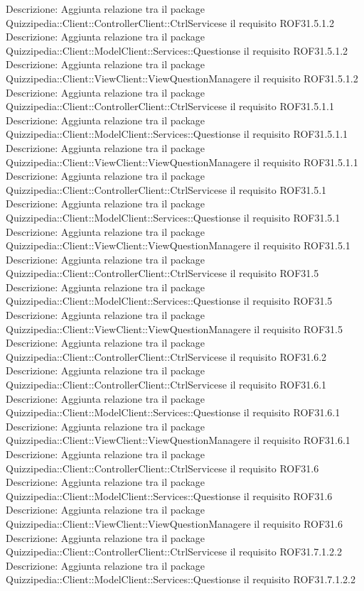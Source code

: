 Descrizione: Aggiunta relazione tra il package Quizzipedia::Client::ControllerClient::CtrlServicese il requisito ROF31.5.1.2 
Descrizione: Aggiunta relazione tra il package Quizzipedia::Client::ModelClient::Services::Questionse il requisito ROF31.5.1.2 
Descrizione: Aggiunta relazione tra il package Quizzipedia::Client::ViewClient::ViewQuestionManagere il requisito ROF31.5.1.2 
Descrizione: Aggiunta relazione tra il package Quizzipedia::Client::ControllerClient::CtrlServicese il requisito ROF31.5.1.1 
Descrizione: Aggiunta relazione tra il package Quizzipedia::Client::ModelClient::Services::Questionse il requisito ROF31.5.1.1 
Descrizione: Aggiunta relazione tra il package Quizzipedia::Client::ViewClient::ViewQuestionManagere il requisito ROF31.5.1.1 
Descrizione: Aggiunta relazione tra il package Quizzipedia::Client::ControllerClient::CtrlServicese il requisito ROF31.5.1 
Descrizione: Aggiunta relazione tra il package Quizzipedia::Client::ModelClient::Services::Questionse il requisito ROF31.5.1 
Descrizione: Aggiunta relazione tra il package Quizzipedia::Client::ViewClient::ViewQuestionManagere il requisito ROF31.5.1 
Descrizione: Aggiunta relazione tra il package Quizzipedia::Client::ControllerClient::CtrlServicese il requisito ROF31.5 
Descrizione: Aggiunta relazione tra il package Quizzipedia::Client::ModelClient::Services::Questionse il requisito ROF31.5 
Descrizione: Aggiunta relazione tra il package Quizzipedia::Client::ViewClient::ViewQuestionManagere il requisito ROF31.5 
Descrizione: Aggiunta relazione tra il package Quizzipedia::Client::ControllerClient::CtrlServicese il requisito ROF31.6.2 
Descrizione: Aggiunta relazione tra il package Quizzipedia::Client::ControllerClient::CtrlServicese il requisito ROF31.6.1 
Descrizione: Aggiunta relazione tra il package Quizzipedia::Client::ModelClient::Services::Questionse il requisito ROF31.6.1 
Descrizione: Aggiunta relazione tra il package Quizzipedia::Client::ViewClient::ViewQuestionManagere il requisito ROF31.6.1 
Descrizione: Aggiunta relazione tra il package Quizzipedia::Client::ControllerClient::CtrlServicese il requisito ROF31.6 
Descrizione: Aggiunta relazione tra il package Quizzipedia::Client::ModelClient::Services::Questionse il requisito ROF31.6 
Descrizione: Aggiunta relazione tra il package Quizzipedia::Client::ViewClient::ViewQuestionManagere il requisito ROF31.6 
Descrizione: Aggiunta relazione tra il package Quizzipedia::Client::ControllerClient::CtrlServicese il requisito ROF31.7.1.2.2 
Descrizione: Aggiunta relazione tra il package Quizzipedia::Client::ModelClient::Services::Questionse il requisito ROF31.7.1.2.2 

